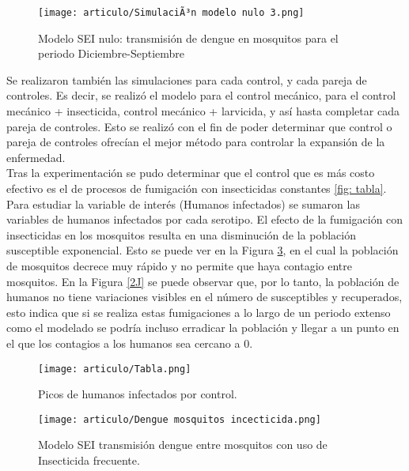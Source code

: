 \documentclass[journal]{IEEEtran}
\begin{document}
\begin{figure}[H]
\centering
\texttt{[image: articulo/SimulaciÃ³n modelo nulo 3.png]}
\caption{Modelo SEI nulo: transmisión de dengue en mosquitos para el periodo Diciembre-Septiembre}
\label{fig:resultado3}
\centering
\end{figure}


Se realizaron también las simulaciones para cada control, y cada pareja de controles. Es decir, se realizó el modelo para el control mecánico, para el control mecánico + insecticida, control mecánico + larvicida, y así hasta completar cada pareja de controles. Esto se realizó con el fin de poder determinar que control o pareja de controles ofrecían el mejor método para controlar la expansión de la enfermedad.
\\Tras la experimentación se pudo determinar que el control que es más costo efectivo es el de procesos de fumigación con insecticidas constantes \ref{fig: tabla}. Para estudiar la variable de interés (Humanos infectados) se sumaron las variables de humanos infectados por cada serotipo. El efecto de la fumigación con insecticidas en los mosquitos resulta en una disminución de la población susceptible exponencial. Esto se puede ver en la Figura \ref{1J}, en el cual la población de mosquitos decrece muy rápido y no permite que haya contagio entre mosquitos. En la Figura \ref{2J} se puede observar que, por lo tanto, la población de humanos no tiene variaciones visibles en el número de susceptibles y recuperados, esto indica que si se realiza estas fumigaciones a lo largo de un periodo extenso como el modelado se podría incluso erradicar la población y llegar a un punto en el que los contagios a los humanos sea cercano a 0.


\begin{figure}[H]
    \centering
        \texttt{[image: articulo/Tabla.png]}
        \caption{Picos de humanos infectados por control.}
        \label{tabla}
    \centering
\end{figure}


\begin{figure}[H]
    \centering
        \texttt{[image: articulo/Dengue mosquitos incecticida.png]}
        \caption{Modelo SEI transmisión dengue entre mosquitos con uso de Insecticida frecuente.}
        \label{1J}
    \centering
\end{figure}
\end{document}
